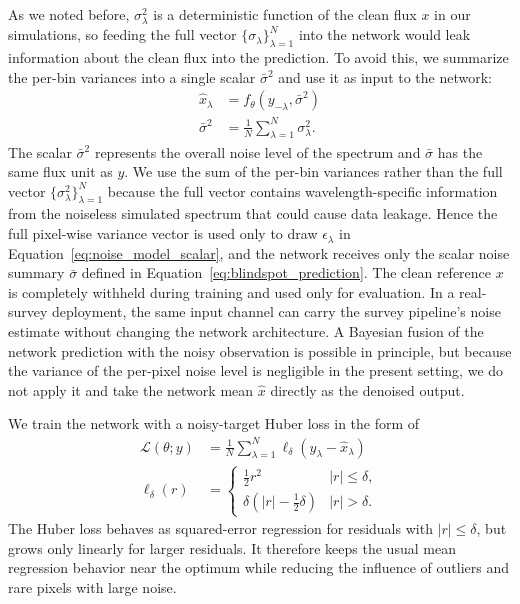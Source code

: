 \documentclass[twocolumn]{aastex7}
\begin{document}
As we noted before, $\sigma_{\lambda}^2$ is a deterministic function of the clean flux $x$ in our simulations, so feeding the full vector $\{\sigma_{\lambda}\}_{\lambda=1}^{N}$ into the network would leak information about the clean flux into the prediction. To avoid this, we summarize the per-bin variances into a single scalar $\bar{\sigma}^2$ and use it as input to the network:
\begin{align}
    \hat{x}_{\lambda} 
        &= f_{\theta}(y_{-\lambda},\bar{\sigma}^2)
        \label{eq:blindspot_prediction} \\
    \bar{\sigma}^2
        &= \frac{1}{N}\sum_{\lambda=1}^{N}\sigma_{\lambda}^{2}.
\end{align}
The scalar $\bar{\sigma}^2$ represents the overall noise level of the spectrum and $\bar{\sigma}$ has the same flux unit as $y$. We use the sum of the per-bin variances rather than the full vector $\{\sigma_{\lambda}^2\}_{\lambda=1}^{N}$ because the full vector contains wavelength-specific information from the noiseless simulated spectrum that could cause data leakage. Hence the full pixel-wise variance vector is used only to draw $\epsilon_{\lambda}$ in Equation~\ref{eq:noise_model_scalar}, and the network receives only the scalar noise summary $\bar{\sigma}$ defined in Equation~\ref{eq:blindspot_prediction}. The clean reference $x$ is completely withheld during training and used only for evaluation. In a real-survey deployment, the same input channel can carry the survey pipeline's noise estimate without changing the network architecture. A Bayesian fusion of the network prediction with the noisy observation is possible in principle, but because the variance of the per-pixel noise level is negligible in the present setting, we do not apply it and take the network mean $\hat{x}$ directly as the denoised output.

We train the network with a noisy-target Huber loss in the form of
\begin{align}
    \mathcal{L}(\theta;y)
    &= \frac{1}{N}\sum_{\lambda=1}^{N}
        \ell_{\delta}\!\left(y_{\lambda} - \hat{x}_{\lambda}\right) \\[1em]
    \ell_{\delta}(r) &=
    \begin{cases}
        \tfrac{1}{2}r^{2} & |r| \leq \delta,\\
        \delta\!\left(|r| - \tfrac{1}{2}\delta\right) & |r| > \delta.
    \end{cases}
    \label{eq:self_supervised_loss}
\end{align}
The Huber loss behaves as squared-error regression for residuals with $|r|\leq\delta$, but grows only linearly for larger residuals. It therefore keeps the usual mean regression behavior near the optimum while reducing the influence of outliers and rare pixels with large noise.
\end{document}
